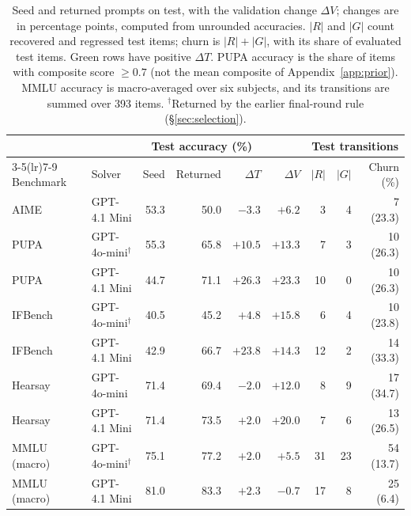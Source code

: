 \documentclass[11pt]{article}
\begin{document}
\begin{table}[!t]
\centering
\small
\setlength{\tabcolsep}{4pt}
\begin{tabular}{llrrrrrrr}
\toprule
\rowcolor{midblue}
 &  & \multicolumn{3}{c}{Test accuracy (\%)} & &
\multicolumn{3}{c}{Test transitions} \\
\cmidrule(lr){3-5}\cmidrule(lr){7-9}
\rowcolor{midblue}
Benchmark & Solver & Seed & Returned & $\Delta T$ & $\Delta V$ & $|R|$ & $|G|$ & Churn (\%) \\
\midrule
AIME & GPT-4.1 Mini & 53.3 & 50.0 & $-3.3$ & $+6.2$ & 3 & 4 & 7 (23.3) \\
\rowcolor{softgreen}
PUPA & GPT-4o-mini$^\dagger$ & 55.3 & 65.8 & $+10.5$ & $+13.3$ & 7 & 3 & 10 (26.3) \\
\rowcolor{softgreen}
PUPA & GPT-4.1 Mini & 44.7 & 71.1 & $+26.3$ & $+23.3$ & 10 & 0 & 10 (26.3) \\
\rowcolor{softgreen}
IFBench & GPT-4o-mini$^\dagger$ & 40.5 & 45.2 & $+4.8$ & $+15.8$ & 6 & 4 & 10 (23.8) \\
\rowcolor{softgreen}
IFBench & GPT-4.1 Mini & 42.9 & 66.7 & $+23.8$ & $+14.3$ & 12 & 2 & 14 (33.3) \\
Hearsay & GPT-4o-mini & 71.4 & 69.4 & $-2.0$ & $+12.0$ & 8 & 9 & 17 (34.7) \\
\rowcolor{softgreen}
Hearsay & GPT-4.1 Mini & 71.4 & 73.5 & $+2.0$ & $+20.0$ & 7 & 6 & 13 (26.5) \\
\rowcolor{softgreen}
MMLU (macro) & GPT-4o-mini$^\dagger$ & 75.1 & 77.2 & $+2.0$ & $+5.5$ & 31 & 23 & 54 (13.7) \\
\rowcolor{softgreen}
MMLU (macro) & GPT-4.1 Mini & 81.0 & 83.3 & $+2.3$ & $-0.7$ & 17 & 8 & 25 (6.4) \\
\bottomrule
\end{tabular}
\caption{Seed and returned prompts on test, with the validation change $\Delta V$; changes are in percentage points, computed from unrounded accuracies. $|R|$ and $|G|$ count recovered and regressed test items; churn is $|R|+|G|$, with its share of evaluated test items. Green rows have positive $\Delta T$. PUPA accuracy is the share of items with composite score $\geq 0.7$ (not the mean composite of Appendix~\ref{app:prior}). MMLU accuracy is macro-averaged over six subjects, and its transitions are summed over 393 items. $^\dagger$Returned by the earlier final-round rule (\S\ref{sec:selection}).}
\label{tab:main}
\end{table}
\end{document}
